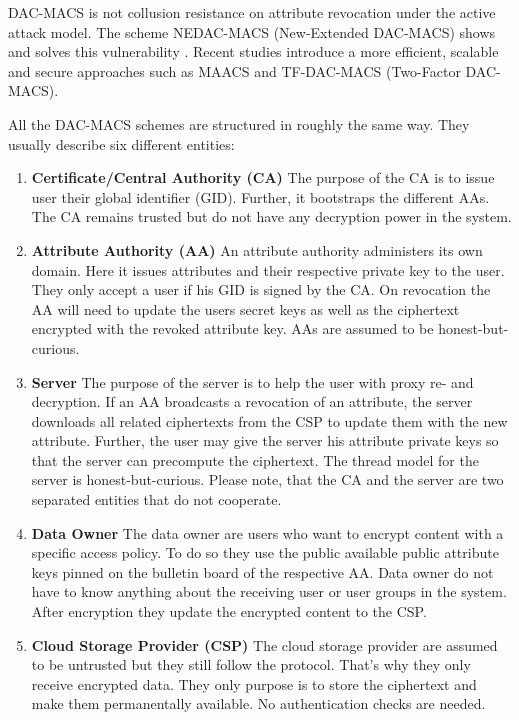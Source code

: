 \ac{DAC-MACS} is not collusion resistance on attribute revocation under the active attack model. The scheme \ac{NEDAC-MACS} (New-Extended \ac{DAC-MACS}) shows and solves this vulnerability \cite{wu2017security}. Recent studies introduce a more efficient, scalable and secure approaches such as \ac{MAACS} \cite{li2016secure} and \ac{TF-DAC-MACS} (Two-Factor \ac{DAC-MACS})\cite{li2017two}. 

All the \ac{DAC-MACS} schemes are structured in roughly the same way. They usually describe six different entities:

\begin{enumerate}
	\item \textbf{Certificate/Central Authority (\ac{CA})} The purpose of the \ac{CA} is to issue user their global identifier (\ac{GID}). Further, it bootstraps the different \ac{AA}s. The \ac{CA} remains trusted but do not have any decryption power in the system. 
	\item \textbf{Attribute Authority (\ac{AA})} An attribute authority administers its own domain. Here it issues attributes and their respective private key to the user. They only accept a user if his \ac{GID} is signed by the \ac{CA}. 
	On revocation the AA will need to update the users secret keys as well as the ciphertext encrypted with the revoked attribute key. \ac{AA}s are assumed to be honest-but-curious.
	\item \textbf{Server} The purpose of the server is to help the user with proxy re- and decryption. If an \ac{AA} broadcasts a revocation of an attribute, the server downloads all related ciphertexts from the \ac{CSP} to update them with the new attribute. 
	Further, the user may give the server his attribute private keys so that the server can precompute the ciphertext. The thread model for the server is honest-but-curious. Please note, that the \ac{CA} and the server are two separated entities that do not cooperate.
	\item \textbf{Data Owner} The data owner are users who want to encrypt content with a specific access policy. To do so they use the public available public attribute keys pinned on the bulletin board of the respective \ac{AA}. Data owner do not have to know anything about the receiving user or user groups in the system. After encryption they update the encrypted content to the \ac{CSP}.
	\item \textbf{Cloud Storage Provider (\ac{CSP})} The cloud storage provider are assumed to be untrusted but they still follow the protocol. That’s why they only receive encrypted data. They only purpose is to store the ciphertext and make them permanentally available. No authentication checks are needed.

\end{enumerate}
